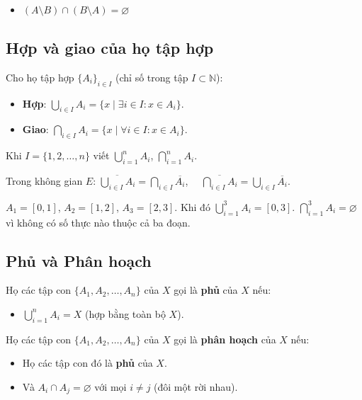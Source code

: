 \documentclass[12pt,a4paper]{article}
\begin{document}
\begin{luuy}
    \begin{itemize}
        \item $(A \setminus B) \cap (B \setminus A) = \varnothing$
    \end{itemize}
\end{luuy}

\subsection{Hợp và giao của họ tập hợp}

\begin{dinhnghia}
  Cho họ tập hợp $\{A_i\}_{i \in I}$ (chỉ số trong tập $I \subset \mathbb{N}$):
  \begin{itemize}
    \item \textbf{Hợp}: $\displaystyle\bigcup_{i \in I} A_i = \{x \mid \exists i \in I: x \in A_i\}$.
    \item \textbf{Giao}: $\displaystyle\bigcap_{i \in I} A_i = \{x \mid \forall i \in I: x \in A_i\}$.
  \end{itemize}
  Khi $I = \{1, 2, \ldots, n\}$ viết $\bigcup_{i=1}^{n} A_i$, $\bigcap_{i=1}^{n} A_i$.
\end{dinhnghia}

\begin{tinhchat}[title={Luật De Morgan cho họ tập hợp}]
  Trong không gian $E$: $\displaystyle\overline{\bigcup_{i \in I} A_i} = \bigcap_{i \in I} \overline{A_i}$, $\quad \displaystyle\overline{\bigcap_{i \in I} A_i} = \bigcup_{i \in I} \overline{A_i}$.
\end{tinhchat}

\begin{vidu}
  $A_1 = [0,1]$, $A_2 = [1,2]$, $A_3 = [2,3]$. Khi đó $\bigcup_{i=1}^{3} A_i = [0,3]$. $\bigcap_{i=1}^{3} A_i = \varnothing$ vì không có số thực nào thuộc cả ba đoạn.
\end{vidu}

\subsection{Phủ và Phân hoạch}

\begin{dinhnghia}
  Họ các tập con $\{A_1, A_2, \ldots, A_n\}$ của $X$ gọi là \textbf{phủ} của $X$ nếu:
  \begin{itemize}
    \item $\bigcup_{i=1}^{n} A_i = X$ (hợp bằng toàn bộ $X$).
  \end{itemize}
  
  Họ các tập con $\{A_1, A_2, \ldots, A_n\}$ của $X$ gọi là \textbf{phân hoạch} của $X$ nếu:
  \begin{itemize}
    \item Họ các tập con đó là \textbf{phủ} của $X$.
    \item Và $A_i \cap A_j = \varnothing$ với mọi $i \ne j$ (đôi một rời nhau).
  \end{itemize}
\end{dinhnghia}
\end{document}

